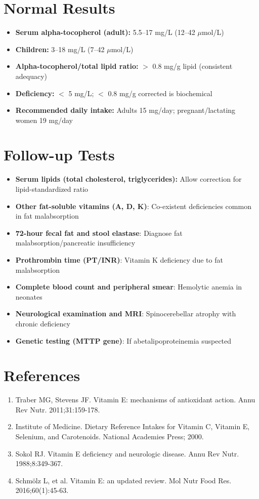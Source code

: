 \section*{Normal Results}
\begin{itemize}
  \item \textbf{Serum alpha-tocopherol (adult):} 5.5--17 mg/L (12--42 $\mu$mol/L)
  \item \textbf{Children:} 3--18 mg/L (7--42 $\mu$mol/L)
  \item \textbf{Alpha-tocopherol/total lipid ratio:} $>$ 0.8 mg/g lipid (consistent adequacy)
  \item \textbf{Deficiency:} $<$ 5 mg/L; $<$ 0.8 mg/g corrected is biochemical
  \item \textbf{Recommended daily intake:} Adults 15 mg/day; pregnant/lactating women 19 mg/day
\end{itemize}

\section*{Follow-up Tests}
\begin{itemize}
  \item \textbf{Serum lipids (total cholesterol, triglycerides):} Allow correction for lipid-standardized ratio
  \item \textbf{Other fat-soluble vitamins (A, D, K)}: Co-existent deficiencies common in fat malabsorption
  \item \textbf{72-hour fecal fat and stool elastase}: Diagnose fat malabsorption/pancreatic insufficiency
  \item \textbf{Prothrombin time (PT/INR)}: Vitamin K deficiency due to fat malabsorption
  \item \textbf{Complete blood count and peripheral smear}: Hemolytic anemia in neonates
  \item \textbf{Neurological examination and MRI}: Spinocerebellar atrophy with chronic deficiency
  \item \textbf{Genetic testing (MTTP gene)}: If abetalipoproteinemia suspected
\end{itemize}

\section*{References}
\begin{enumerate}
  \item Traber MG, Stevens JF. Vitamin E: mechanisms of antioxidant action. Annu Rev Nutr. 2011;31:159-178.
  \item Institute of Medicine. Dietary Reference Intakes for Vitamin C, Vitamin E, Selenium, and Carotenoids. National Academies Press; 2000.
  \item Sokol RJ. Vitamin E deficiency and neurologic disease. Annu Rev Nutr. 1988;8:349-367.
  \item Schmölz L, et al. Vitamin E: an updated review. Mol Nutr Food Res. 2016;60(1):45-63.
\end{enumerate}

\clearpage